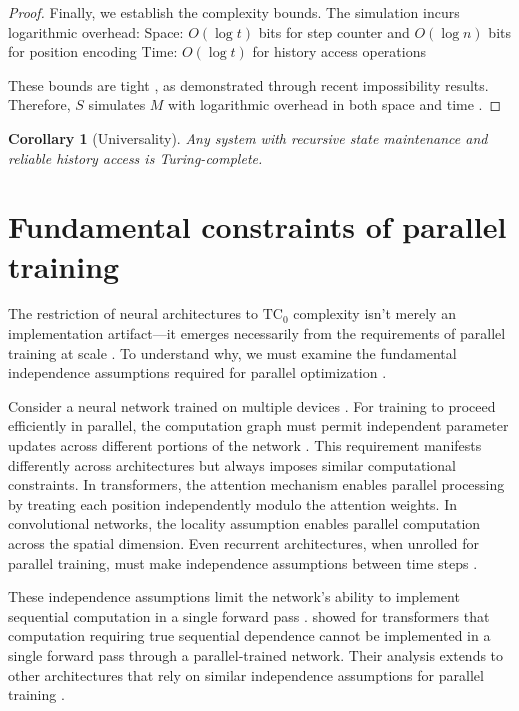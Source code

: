 \documentclass[12pt]{article}
\newtheorem{corollary}[theorem]{Corollary}
\begin{document}
\begin{proof}
Finally, we establish the complexity bounds. The simulation incurs logarithmic overhead:
Space: $O(\log t)$ bits for step counter and $O(\log n)$ bits for position encoding
Time: $O(\log t)$ for history access operations

These bounds are tight \cite{parzych2024memory,hhan2024new,boyle2024memory}, as demonstrated through recent impossibility results. Therefore, $S$ simulates $M$ with logarithmic overhead in both space and time \cite{savage1994space,vonkorff2019molecular,bennett1989time}.
\end{proof}

\begin{corollary}[Universality]
Any system with recursive state maintenance and reliable history access is Turing-complete.
\end{corollary}

\section{Fundamental constraints of parallel training}

The restriction of neural architectures to $\text{TC}_0$ complexity isn't merely an implementation artifact---it emerges necessarily from the requirements of parallel training at scale \cite{merrill2023parallelism,peng2024limitations}. To understand why, we must examine the fundamental independence assumptions required for parallel optimization \cite{shallue2019measuring}.

Consider a neural network trained on multiple devices \cite{zhao2024epha}. For training to proceed efficiently in parallel, the computation graph must permit independent parameter updates across different portions of the network \cite{barrett2019analyzing}. This requirement manifests differently across architectures but always imposes similar computational constraints. In transformers, the attention mechanism enables parallel processing by treating each position independently modulo the attention weights. In convolutional networks, the locality assumption enables parallel computation across the spatial dimension. Even recurrent architectures, when unrolled for parallel training, must make independence assumptions between time steps \cite{dickson2023rnns}.

These independence assumptions limit the network's ability to implement sequential computation in a single forward pass \cite{wei2022chain}. \cite{merrill2023parallelism} showed for transformers that computation requiring true sequential dependence cannot be implemented in a single forward pass through a parallel-trained network. Their analysis extends to other architectures that rely on similar independence assumptions for parallel training \cite{stillman2023generative}.
\end{document}
